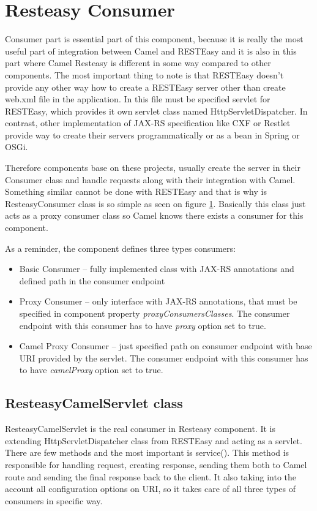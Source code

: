 \documentclass[12pt,final,oneside]{fithesis2}
\begin{document}
\section{Resteasy Consumer}
Consumer part is essential part of this component, because it is really the most useful part of integration between Camel and RESTEasy and it is also in this part where Camel Resteasy is different in some way compared to other components. The most important thing to note is that RESTEasy doesn't provide any other way how to create a RESTEasy server other than create web.xml file in the application. In this file must be specified servlet for RESTEasy, which provides it own servlet class named HttpServletDispatcher. In contrast, other implementation of JAX-RS specification like CXF or Restlet provide way to create their servers programmatically or as a bean in Spring or OSGi.

Therefore components base on these projects, usually create the server in their Consumer class and handle requests along with their integration with Camel. Something similar cannot be done with RESTEasy and that is why is ResteasyConsumer class is so simple as seen on figure \ref{}. Basically this class just acts as a proxy consumer class so Camel knows there exists a consumer for this component.

As a reminder, the component defines three types consumers:
\begin{itemize}
\item
Basic Consumer  -- fully implemented class with JAX-RS annotations and defined path in the consumer endpoint

\item
Proxy Consumer -- only interface with JAX-RS annotations, that must be specified in component property \textit{proxyConsumersClasses}. The consumer endpoint with this consumer has to have \textit{proxy} option set to true. 

\item
Camel Proxy Consumer -- just specified path on consumer endpoint with base URI provided by the servlet. The consumer endpoint with this consumer has to have \textit{camelProxy} option set to true. 
\end{itemize}




\subsection{ResteasyCamelServlet class}\label{servlet}
ResteasyCamelServlet is the real consumer in Resteasy component. It is extending HttpServletDispatcher class from RESTEasy and acting as a servlet. There are few methods and the most important is service(). This method is responsible for handling request, creating response, sending them both to Camel route and sending the final response back to the client. It also taking into the account all configuration options on URI, so it takes care of all three types of consumers in specific way. 
\end{document}
